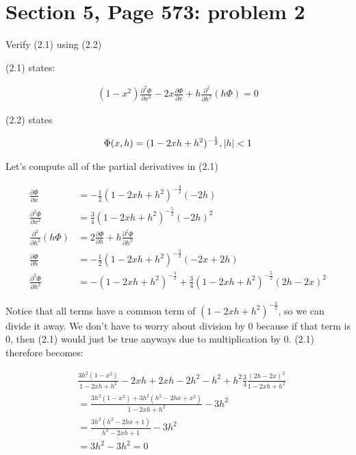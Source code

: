 \documentclass{article}
\numberwithin{equation}{section}
\begin{document}
\section{Section 5, Page 573: problem 2}

Verify (2.1) using (2.2)

(2.1) states:

\begin{align}
    (1-x^2) \frac{\partial^2 \Phi}{\partial x^2} - 2x \frac{\partial \Phi}{\partial x} + h \frac{\partial^2}{\partial h^2} (h \Phi) = 0
\end{align}

(2.2) states 

\begin{align}
    \Phi(x,h) = (1- 2xh + h^2)^{-\frac{1}{2}}, \abs{h} < 1
\end{align}

Let's compute all of the partial derivatives in (2.1)

\begin{align}
    \frac{\partial \Phi}{\partial x} &= -\frac{1}{2} (1-2xh+h^2)^{-\frac{3}{2}} (-2h) \\
    \frac{\partial^2 \Phi}{\partial x^2} &= \frac{3}{4}(1-2xh+h^2)^{-\frac{5}{2}} (-2h)^2 \\
    \frac{\partial^2}{\partial h^2} (h\Phi) &= 2\frac{\partial \Phi}{\partial h} + h \frac{\partial^2 \Phi}{\partial h^2} \\
    \frac{\partial \Phi}{\partial h} &= -\frac{1}{2}(1-2xh+h^2)^{-\frac{3}{2}} (-2x + 2h) \\
    \frac{\partial^2 \Phi}{\partial h^2} &= -(1-2xh+h^2)^{-\frac{3}{2}} + \frac{3}{4}(1-2xh+h^2)^{-\frac{5}{2}}(2h-2x)^2
\end{align}

Notice that all terms have a common term of $(1-2xh+h^2)^{-\frac{3}{2}}$, so we can divide it away. We don't have to worry about division by 0 because if that term is 0, then (2.1) would just be true anyways due to multiplication by 0. (2.1) therefore becomes:

\begin{align}
    &\frac{3h^2 (1-x^2)}{1-2xh+h^2} - 2xh + 2xh - 2h^2 - h^2  + h^2 \frac{3}{4} \frac{(2h-2x)^2}{1-2xh+h^2} \\
    &= \frac{3h^2(1-x^2)+ 3 h^2(h^2 -2hx+x^2)}{1-2xh+h^2} - 3h^2 \\
    &= \frac{3h^2(h^2 - 2hx + 1)}{h^2-2xh+1} - 3h^2\\
    &=  3h^2 - 3h^2 = 0
\end{align}
\end{document}

